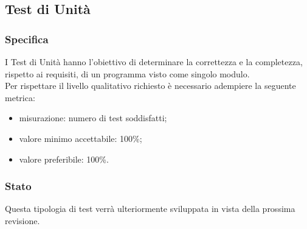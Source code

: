 \subsection{Test di Unità}

	\subsubsection{Specifica}
		I Test di Unità hanno l'obiettivo di determinare la correttezza e la completezza, rispetto ai requisiti, di un programma visto come singolo modulo.\\
		Per rispettare il livello qualitativo richiesto è necessario adempiere la seguente metrica:
		\begin{itemize}
			\item{misurazione: numero di test soddisfatti;}
			\item{valore minimo accettabile: 100\%;}
			\item{valore preferibile: 100\%.}
		\end{itemize}


	\subsubsection{Stato}
		Questa tipologia di test verrà ulteriormente sviluppata in vista della prossima revisione.
			
			

